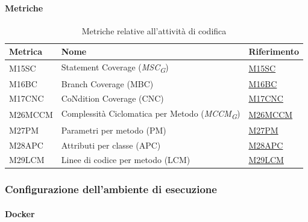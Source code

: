 \paragraph{Metriche}
\begin{table}[H]
    \centering
    \begin{tabular}{|C{3cm}|C{3cm}|C{4cm}|}
    \hline
    Metrica & Nome & Riferimento \\
    \hline \hline
    M15SC & Statement Coverage (\textit{MSC}\textsubscript{\textit{G}}) &  \hyperlink{item:M15SC}{\textcolor{linkcolor}{M15SC}} \\
    M16BC & Branch Coverage (MBC) &  \hyperlink{item:M16BC}{\textcolor{linkcolor}{M16BC}} \\
    M17CNC & CoNdition Coverage (CNC) &  \hyperlink{item:M17CNC}{\textcolor{linkcolor}{M17CNC}} \\
    M26MCCM & Complessità Ciclomatica per Metodo (\textit{MCCM}\textsubscript{\textit{G}}) &  \hyperlink{item:M26MCCM}{\textcolor{linkcolor}{M26MCCM}} \\
    M27PM & Parametri per metodo (PM) & \hyperlink{item:M27PM}{\textcolor{linkcolor}{M27PM}} \\
    M28APC & Attributi per classe (APC) & \hyperlink{item:M28APC}{\textcolor{linkcolor}{M28APC}} \\
    M29LCM & Linee di codice per metodo (LCM) & \hyperlink{item:M29LCM}{\textcolor{linkcolor}{M29LCM}} \\ 
    \hline
    \end{tabular}
    \caption{Metriche relative all'attività di codifica}
\end{table}


\subsubsection{Configurazione dell'ambiente di esecuzione}
\paragraph{Docker}

